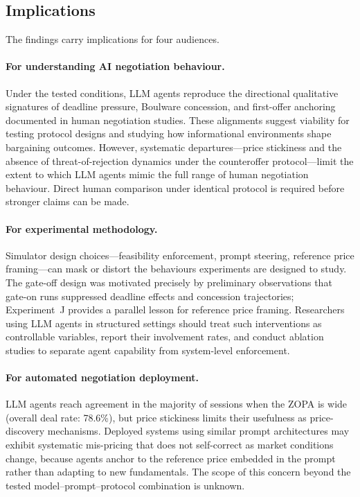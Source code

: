 \subsection{Implications}

The findings carry implications for four audiences.

\paragraph{For understanding AI negotiation behaviour.}
Under the tested conditions, LLM agents reproduce the directional qualitative signatures of deadline pressure, Boulware concession, and first-offer anchoring documented in human negotiation studies.  These alignments suggest viability for testing protocol designs and studying how informational environments shape bargaining outcomes.  However, systematic departures---price stickiness and the absence of threat-of-rejection dynamics under the counteroffer protocol---limit the extent to which LLM agents mimic the full range of human negotiation behaviour.  Direct human comparison under identical protocol is required before stronger claims can be made.

\paragraph{For experimental methodology.}
Simulator design choices---feasibility enforcement, prompt steering, reference price framing---can mask or distort the behaviours experiments are designed to study.  The gate-off design was motivated precisely by preliminary observations that gate-on runs suppressed deadline effects and concession trajectories; Experiment~J provides a parallel lesson for reference price framing.  Researchers using LLM agents in structured settings should treat such interventions as controllable variables, report their involvement rates, and conduct ablation studies to separate agent capability from system-level enforcement.

\paragraph{For automated negotiation deployment.}
LLM agents reach agreement in the majority of sessions when the ZOPA is wide (overall deal rate: 78.6\%), but price stickiness limits their usefulness as price-discovery mechanisms.  Deployed systems using similar prompt architectures may exhibit systematic mis-pricing that does not self-correct as market conditions change, because agents anchor to the reference price embedded in the prompt rather than adapting to new fundamentals.  The scope of this concern beyond the tested model--prompt--protocol combination is unknown.

